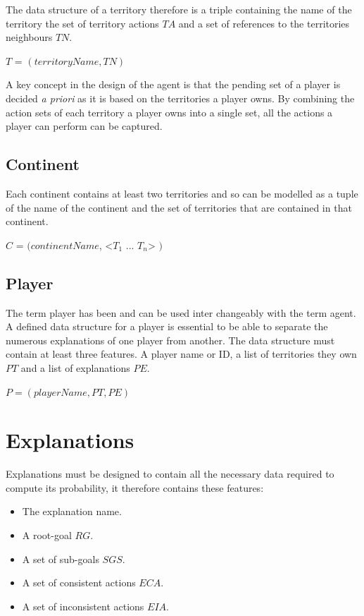 \documentclass[parskip]{cs4rep}
\begin{document}
\newpage

The data structure of a territory therefore is a triple containing the name of the territory the set of territory actions $TA$ and a set of references to the territories neighbours $TN$.

\centerline{
$T$ = $( territoryName, TN )$
}

A key concept in the design of the agent is that the pending set of a player is decided \textit{a priori} as it is based on the territories a player owns. By combining the action sets of each territory a player owns into a single set, all the actions a player can perform can be captured.

\subsection{Continent}

Each continent contains at least two territories and so can be modelled as a tuple of the name of the continent and the set of territories that are contained in that continent.

\centerline{
$C$ = $( continentName$, <$T_{1}$ ... $T_{n}$> $)$
}

\subsection{Player}

The term player has been and can be used inter changeably with the term agent. A defined data structure for a player is essential to be able to separate the numerous explanations of one player from another. The data structure must contain at least three features. A player name or ID, a list of territories they own $PT$ and a list of explanations $PE$.\newline

\centerline{
$P = ( playerName, PT, PE )$
}

\section{Explanations}

Explanations must be designed to contain all the necessary data required to compute its probability, it therefore contains these features:

\begin{itemize}
\item
The explanation name.
\item
A root-goal $RG$.
\item
A set of sub-goals $SGS$.
\item
A set of consistent actions $ECA$.
\item
A set of inconsistent actions $EIA$.
\end{itemize}
\end{document}
